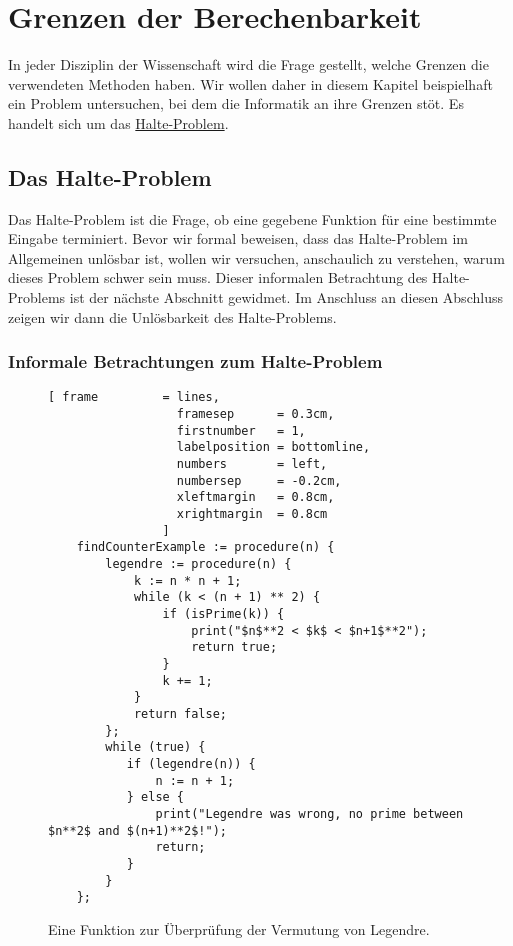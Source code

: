 \chapter{Grenzen der Berechenbarkeit}
In jeder Disziplin der Wissenschaft wird die Frage gestellt, welche Grenzen die
verwendeten Methoden haben.   Wir wollen daher in diesem Kapitel beispielhaft ein Problem
untersuchen, bei dem die Informatik an ihre Grenzen st\"{o}\3t.  Es handelt sich um das
\href{http://de.wikipedia.org/wiki/Halteproblem}{Halte-Problem}.  

\section{Das Halte-Problem}
Das Halte-Problem ist die Frage, ob eine gegebene Funktion f\"{u}r eine bestimmte Eingabe 
terminiert.  Bevor wir formal beweisen, dass das Halte-Problem im Allgemeinen unl\"{o}sbar ist, wollen 
wir versuchen, anschaulich zu verstehen, warum dieses Problem schwer sein muss.  Dieser informalen
Betrachtung des Halte-Problems ist der n\"{a}chste Abschnitt gewidmet.  Im Anschluss an diesen Abschluss
zeigen wir dann die Unl\"{o}sbarkeit des Halte-Problems. 

\subsection{Informale Betrachtungen zum Halte-Problem}


\begin{figure}[!ht]
\centering
\begin{Verbatim}[ frame         = lines, 
                  framesep      = 0.3cm, 
                  firstnumber   = 1,
                  labelposition = bottomline,
                  numbers       = left,
                  numbersep     = -0.2cm,
                  xleftmargin   = 0.8cm,
                  xrightmargin  = 0.8cm
                ]
    findCounterExample := procedure(n) {
        legendre := procedure(n) {
            k := n * n + 1;
            while (k < (n + 1) ** 2) {
                if (isPrime(k)) {
                    print("$n$**2 < $k$ < $n+1$**2");
                    return true;
                }
                k += 1;
            }
            return false;
        };
        while (true) {
           if (legendre(n)) {
               n := n + 1;
           } else {
               print("Legendre was wrong, no prime between $n**2$ and $(n+1)**2$!");
               return;
           }
        }
    };
\end{Verbatim} 
\vspace*{-0.3cm}
\caption{Eine Funktion zur \"{U}berpr\"{u}fung der Vermutung von Legendre.}
\label{fig:legendre.stlx}
\end{figure}

